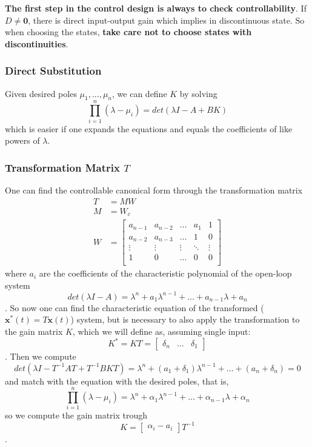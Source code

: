 \documentclass[a4paper]{report}
\begin{document}
\textbf{The first step in the control design is always to check controllability}. If $D\neq \bm{0}$, there is direct input-output gain which implies in discontinuous state. So when choosing the states, \textbf{take care not to choose states with discontinuities}.

\subsubsection*{Direct Substitution}

Given desired poles $\mu_1, \ldots, \mu_n $, we can define $K$ by solving \[
    \prod_{i=1}^{n} \left(  \lambda - \mu_i\right) = det(\lambda I - A + BK)
\] which is easier if one expands the equations and equals the coefficients of like powers of $\lambda$.

\subsubsection*{Transformation Matrix $T$}

One can find the controllable canonical form through the transformation matrix 
\begin{align*}
    T &= MW \\
    M &= W_c \\
    W &=
    \begin{bmatrix}
	a_{n-1} & a_{n-2} & \ldots & a_1 & 1 \\
	a_{n-2} & a_{n-3} & \ldots & 1 & 0 \\
	\vdots & \vdots & \vdots & \ddots & \vdots \\
	1 & 0 & \ldots & 0 & 0 \\
    \end{bmatrix} 
\end{align*}
where $a_i$ are the coefficients of the characteristic polynomial of the open-loop system \[
    det(\lambda I - A) = \lambda^{n} + a_1\lambda^{n-1} + \ldots + a_{n-1}\lambda + a_n
\]. So now one can find the characteristic equation of the transformed ($\bm{x}^{*}(t) = T \bm{x}(t)$) system, but is necessary to also apply the transformation to the gain matrix $K$, which we will define as, assuming single input: \[
K^{*} = KT = \begin{bmatrix} \delta_n & \ldots & \delta_1 \end{bmatrix} 
\]. Then we compute \[
det\left( \lambda I - T^{-1}AT + T^{-1}BKT \right) = \lambda^n + (a_1+\delta_1)\lambda^{n-1} + \ldots + (a_n + \delta_n) = 0
\] and match with the equation with the desired poles, that is, \[
    \prod_{i=1}^{n} \left(  \lambda - \mu_i\right) = \lambda^{n} + \alpha_1\lambda^{n-1} + \ldots + \alpha_{n-1}\lambda + \alpha_n
\] so we compute the gain matrix trough \[
K = \begin{bmatrix} \alpha_i - a_i \end{bmatrix} T^{-1}
\].
\end{document}

